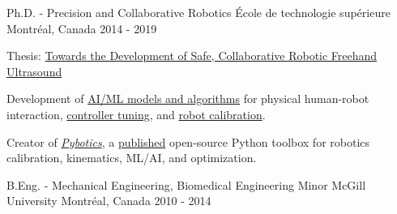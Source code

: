 \begin{cventries}

    \cventry
    {Ph.D. - Precision and Collaborative Robotics}
    {École de technologie supérieure}
    {Montréal, Canada}
    {2014 - 2019}
    {
        \begin{cvitems}
            \item{Thesis: \href{https://www.nicholasnadeau.com/publication/nadeau-2019-towards/}{Towards the Development of Safe, Collaborative Robotic Freehand Ultrasound}}
            \item{Development of \href{https://www.nicholasnadeau.com/talk/hardware-in-the-loop-training-robot-contact-in-an-unstructured-environment/}{AI/ML models and algorithms} for physical human-robot interaction, \href{https://www.nicholasnadeau.com/publication/nadeau-2018-evolutionary/}{controller tuning}, and \href{https://www.nicholasnadeau.com/publication/nadeau-2019-impedance/}{robot calibration}.}
            \item{Creator of \href{https://github.com/EngNadeau/pybotics}{\textit{Pybotics}}, a \href{https://joss.theoj.org/papers/10.21105/joss.01738}{published} open-source Python toolbox for robotics calibration, kinematics, ML/AI, and optimization.}
        \end{cvitems}
    }

    \cventry
    {B.Eng. - Mechanical Engineering, Biomedical Engineering Minor}
    {McGill University}
    {Montréal, Canada}
    {2010 - 2014}
    {
        \begin{cvitems}
        \end{cvitems}
    }

\end{cventries}
